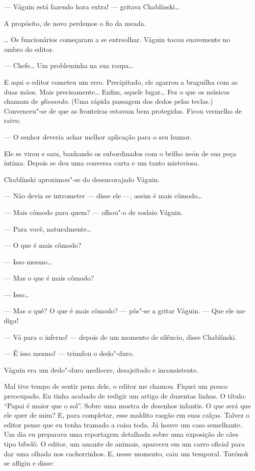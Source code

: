 --- Váguin está fazendo hora extra! --- gritava
Chablínski\ldots{}

A propósito, de novo perdemos o fio da meada.

\ldots{} Os funcionários começaram a se entreolhar. Váguin tocou suavemente
no ombro do editor.

--- Chefe\ldots{} Um probleminha na sua roupa\ldots{}

E aqui o editor cometeu um erro. Precipitado, ele agarrou a braguilha
com as duas mãos. Mais precisamente\ldots{} Enfim, aquele lugar\ldots{} Fez o que
os músicos chamam de \emph{glissando}. (Uma rápida passagem dos dedos
pelas teclas.) Convenceu"-se de que as fronteiras estavam bem protegidas.
Ficou vermelho de raiva:

--- O senhor deveria achar melhor aplicação para o seu humor.

Ele se virou e saiu, banhando os subordinados com o brilho neón de sua
peça íntima. Depois se deu uma conversa curta e um tanto misteriosa.

Chablínski aproximou"-se do desencorajado Váguin.

--- Não devia se intrometer --- disse ele ---,
assim é mais cômodo\ldots{}

--- Mais cômodo para quem? --- olhou"-o de soslaio Váguin.

--- Para você, naturalmente\ldots{}

--- O que é mais cômodo?

--- Isso mesmo\ldots{}

--- Mas o que é mais cômodo?

--- Isso\ldots{}

--- Mas o quê? O que é mais cômodo? --- pôs"-se a gritar
Váguin. --- Que ele me diga!

--- Vá para o inferno! --- depois de um momento de
silêncio, disse Chablínski.

--- É isso mesmo! --- triunfou o dedo"-duro.

Váguin era um dedo"-duro medíocre, desajeitado e inconsistente.

Mal tive tempo de sentir pena dele, o editor me chamou. Fiquei um pouco
preocupado. Eu tinha acabado de redigir um artigo de duzentas linhas. O
título: ``Papai é maior que o sol''. Sobre uma mostra de desenhos
infantis. O que será que ele quer de mim? E, para completar, esse
maldito rasgão em suas calças. Talvez o editor pense que eu tenha
tramado a coisa toda. Já houve um caso semelhante. Um dia eu preparava
uma reportagem detalhada sobre uma exposição de cães tipo bibelô. O
editor, um amante de animais, apareceu em um carro oficial para dar uma
olhada nos cachorrinhos. E, nesse momento, caiu um temporal. Turónok se
afligiu e disse:


